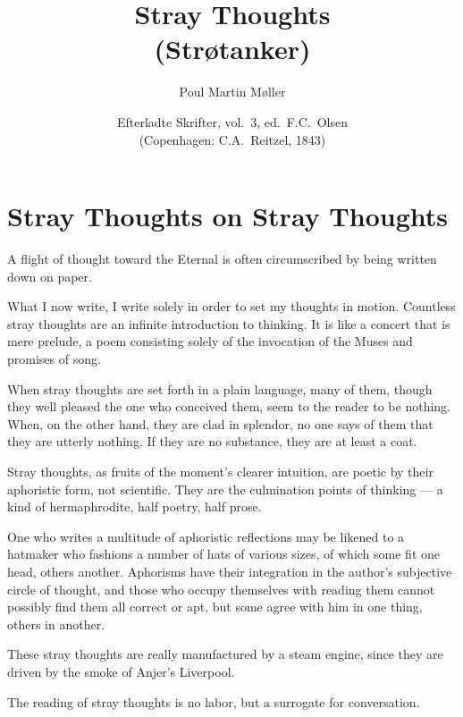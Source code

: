 \documentclass[12pt,a4paper]{article}
\title{\textbf{Stray Thoughts}\\[4pt]\large (Strøtanker)}
\author{Poul Martin Møller}
\date{Efterladte Skrifter, vol.\ 3, ed.\ F.C.\ Olsen\\
  (Copenhagen: C.A.\ Reitzel, 1843)}
\newcommand{\opage}[1]{\marginnote{\footnotesize\textit{[#1]}}}
\newcommand{\aphsep}{\par\smallskip\centerline{\textasteriskcentered}\smallskip}
\begin{document}
\maketitle
\thispagestyle{fancy}

\bigskip

\section*{Stray Thoughts on Stray Thoughts}
\label{ch:001}

A flight of thought toward the Eternal is often circumscribed by being written
down on paper.

\aphsep

What I now write, I write solely in order to set my thoughts in motion.
Countless stray thoughts are an infinite introduction to thinking. It is like a
concert that is mere prelude, a poem consisting solely of the invocation of the
Muses and promises of song.

\aphsep

When stray thoughts are set forth in a plain language, many of them, though they
well pleased the one who conceived them, seem to the reader to be nothing. When,
on the other hand, they are clad in splendor, no one says of them that they are
utterly nothing. If they are no substance, they are at least a coat.

\aphsep

Stray thoughts, as fruits of the moment's clearer intuition, are poetic by their
aphoristic form, not scientific. They are the culmination points of thinking ---
a kind of hermaphrodite, half poetry, half prose.

\aphsep

One who writes a multitude of aphoristic reflections may be likened to a
hatmaker who fashions a number of hats of \opage{16}various sizes, of which some
fit one head, others another. Aphorisms have their integration in the author's
subjective circle of thought, and those who occupy themselves with reading them
cannot possibly find them all correct or apt, but some agree with him in one
thing, others in another.

\aphsep

These stray thoughts are really manufactured by a steam engine, since they are
driven by the smoke of Anjer's Liverpool.

\aphsep

The reading of stray thoughts is no labor, but a surrogate for conversation.
\end{document}
